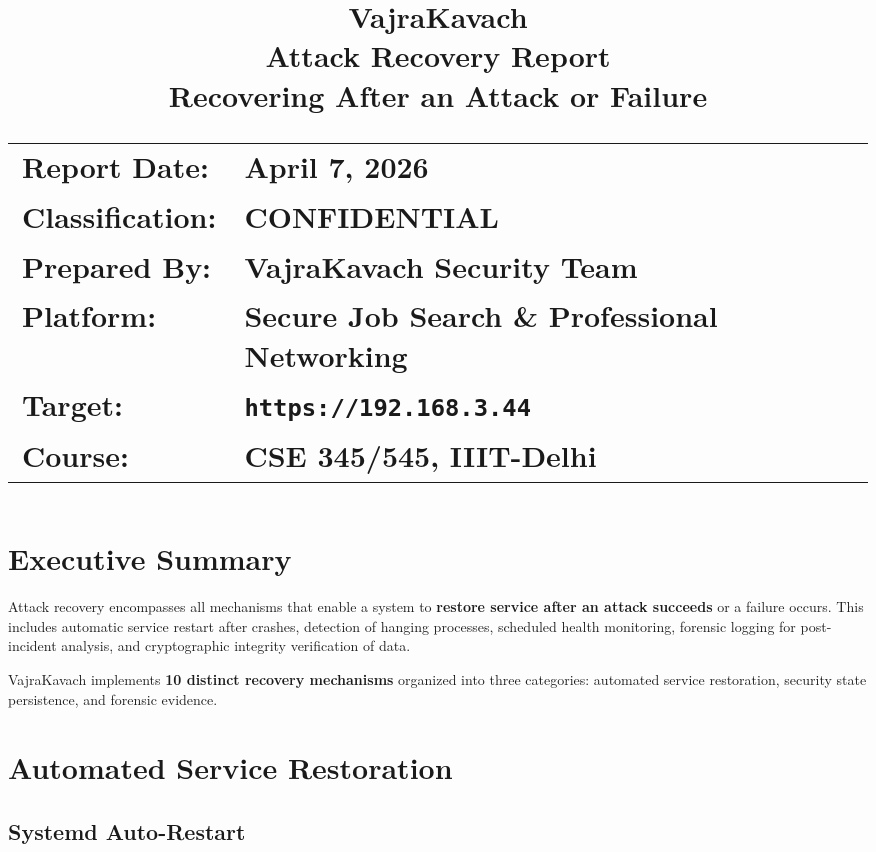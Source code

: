 \documentclass[11pt,a4paper]{article}
\title{
  \vspace{-1cm}
  \textbf{\Huge VajraKavach}\\[0.3cm]
  \textbf{\Large Attack Recovery Report}\\[0.3cm]
  \large Recovering After an Attack or Failure\\[0.8cm]
  \normalsize
  \begin{tabular}{ll}
    \textbf{Report Date:} & April 7, 2026 \\
    \textbf{Classification:} & CONFIDENTIAL \\
    \textbf{Prepared By:} & VajraKavach Security Team \\
    \textbf{Platform:} & Secure Job Search \& Professional Networking \\
    \textbf{Target:} & \texttt{https://192.168.3.44} \\
    \textbf{Course:} & CSE 345/545, IIIT-Delhi \\
  \end{tabular}
}
\author{}
\date{}
\begin{document}
\maketitle
\thispagestyle{fancy}

\newpage
\tableofcontents
\newpage

\section{Executive Summary}

Attack recovery encompasses all mechanisms that enable a system to \textbf{restore service after an attack succeeds} or a failure occurs. This includes automatic service restart after crashes, detection of hanging processes, scheduled health monitoring, forensic logging for post-incident analysis, and cryptographic integrity verification of data.

VajraKavach implements \textbf{10 distinct recovery mechanisms} organized into three categories: automated service restoration, security state persistence, and forensic evidence.

\section{Automated Service Restoration}

\subsection{Systemd Auto-Restart}
\end{document}

